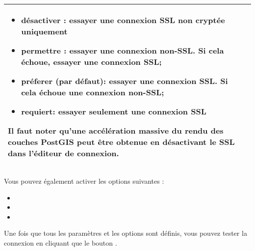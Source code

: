 \begin{table}[ht]
\begin{tabular}{|l|p{5in}|}
\begin {itemize}
\item désactiver : essayer une connexion SSL non cryptée uniquement
\item permettre : essayer une connexion non-SSL. Si cela échoue, essayer une connexion SSL;
\item préferer (par défaut): essayer une connexion SSL. Si cela échoue une connexion non-SSL;
\item requiert: essayer seulement une connexion SSL
\end {itemize}
Il faut noter qu'une accélération massive du rendu des couches PostGIS peut être obtenue en désactivant le SSL dans l'éditeur de connexion. \\
\hline
\hline
\end{tabular}
\end{table}

Vous pouvez également activer les options suivantes :

\begin{itemize}
\item {}
\item {}
\item {}
\end{itemize}

Une fois que tous les paramètres et les options sont définis, vous pouvez tester la connexion en cliquant que le bouton  .

